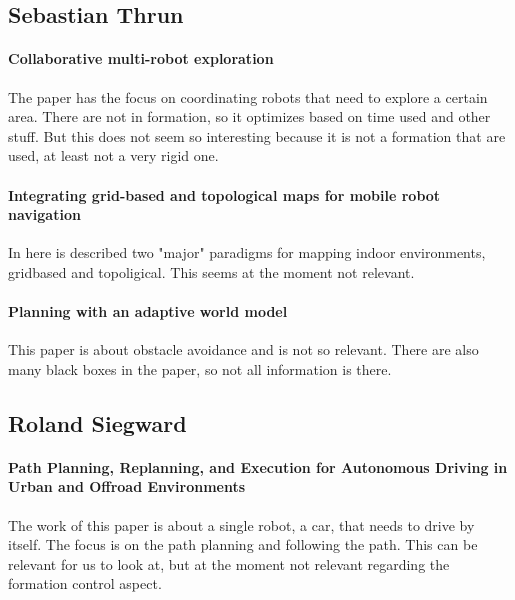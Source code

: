 \subsection{Sebastian Thrun}

{\vskip0pt\color{gray}
\paragraph{Collaborative multi-robot exploration}
The paper has the focus on coordinating robots that need to explore a certain area. There are not in formation, so it optimizes based on time used and other stuff. But this does not seem so interesting because it is not a formation that are used, at least not a very rigid one.}

{\vskip0pt\color{gray}
\paragraph{Integrating grid-based and topological maps for mobile robot navigation}
In here is described two "major" paradigms for mapping indoor environments, gridbased and topoligical. This seems at the moment not relevant.}

{\vskip0pt\color{gray}
\paragraph{Planning with an adaptive world model}
This paper is about obstacle avoidance and is not so relevant. There are also many black boxes in the paper, so not all information is there.}


\subsection{Roland Siegward}

\paragraph{Path Planning, Replanning, and Execution for Autonomous Driving in Urban and Offroad Environments}
The work of this paper is about a single robot, a car, that needs to drive by itself. The focus is on the path planning and following the path. This can be relevant for us to look at, but at the moment not relevant regarding the formation control aspect.
